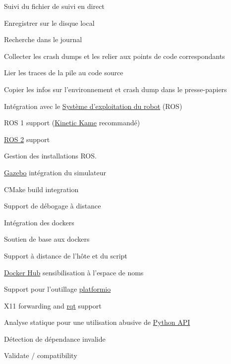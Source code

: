 \begin{multicols}{2}
\begin{todolist}
\begin{todolist}
\item Suivi du fichier de suivi en direct
\item Enregistrer sur le disque local
\item Recherche dans le journal
\end{todolist}
\item Collecter les crash dumps et les relier aux points de code correspondants
\begin{todolist}
\item Lier les traces de la pile au code source
\item Copier les infos sur l'environnement et crash dump dans le presse-papiers
\end{todolist}
\item Intégration avec le \href{https://www.ros.org}{Système d'exploitation du robot} (ROS)
\begin{todolist}
\item[\done] ROS 1 support (\href{https://wiki.ros.org/kinetic}{Kinetic Kame} recommandé)
\item \href{https://github.com/ros2/ros2/wiki}{ROS 2} support
\item[\done] Gestion des installations ROS.
\end{todolist}
\item[\done] \href{http://gazebosim.org/}{Gazebo} intégration du simulateur
\item CMake build integration
\item Support de débogage à distance
\item Intégration des dockers
\begin{todolist}
\item[\done] Soutien de base aux dockers
\item Support à distance de l'hôte et du script
\item \href{https://hub.docker.com}{Docker Hub} sensibilisation à l'espace de noms
\item Support pour l'outillage \href{https://platformio.org}{platformio}
\item X11 forwarding and \href{https://wiki.ros.org/rqt}{rqt} support
\end{todolist}
\item Analyse statique pour une utilisation abusive de \href{https://wiki.ros.org/rospy}{Python API}
\begin{todolist}
\item Détection de dépendance invalide
\item Validate / compatibility

\end{todolist}
\end{todolist}
\end{multicols}
